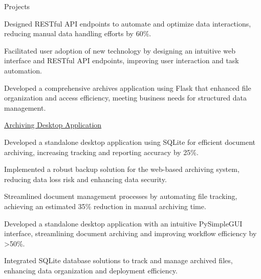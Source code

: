 \documentclass{resume} %
\begin{document}
\begin{rSection}{Projects}
\begin{rSubsection}
                                    \item Designed RESTful API endpoints to automate and optimize data interactions, reducing manual data handling efforts by 60\%.
                                    \item Facilitated user adoption of new technology by designing an intuitive web interface and RESTful API endpoints, improving user interaction and task automation.
                                    \item Developed a comprehensive archives application using Flask that enhanced file organization and access efficiency, meeting business needs for structured data management.
                            \end{rSubsection}
                    \begin{rSubsection}
                                    {\href{https://github.com/aa{-}dank/archives\_archiver}{Archiving Desktop Application}}
                                {}{}{}
                                    \item Developed a standalone desktop application using SQLite for efficient document archiving, increasing tracking and reporting accuracy by 25\%.
                                    \item Implemented a robust backup solution for the web{-}based archiving system, reducing data loss risk and enhancing data security.
                                    \item Streamlined document management processes by automating file tracking, achieving an estimated 35\% reduction in manual archiving time.
                                    \item Developed a standalone desktop application with an intuitive PySimpleGUI interface, streamlining document archiving and improving workflow efficiency by >50\%.
                                    \item Integrated SQLite database solutions to track and manage archived files, enhancing data organization and deployment efficiency.
                        \end{rSubsection}
            \end{rSection}
\end{document}
